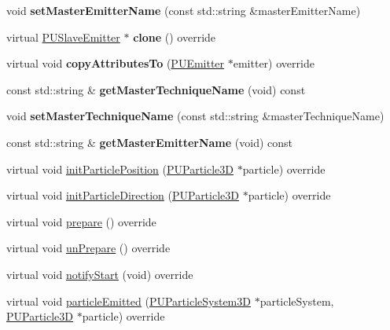 \begin{DoxyCompactItemize}
\mbox{\label{classPUSlaveEmitter_ab17fb354cca69c4c72ee57b47a08f8bc}} 
void {\bfseries set\+Master\+Emitter\+Name} (const std\+::string \&master\+Emitter\+Name)
\item 
\mbox{\label{classPUSlaveEmitter_a0d6b877452c958ede8eb77e0900848e1}} 
virtual \hyperlink{classPUSlaveEmitter}{P\+U\+Slave\+Emitter} $\ast$ {\bfseries clone} () override
\item 
\mbox{\label{classPUSlaveEmitter_a9219c997caf74a5bc433a231b73061b5}} 
virtual void {\bfseries copy\+Attributes\+To} (\hyperlink{classPUEmitter}{P\+U\+Emitter} $\ast$emitter) override
\item 
\mbox{\label{classPUSlaveEmitter_a10ad7cb01485e57d79ccae9603865af5}} 
const std\+::string \& {\bfseries get\+Master\+Technique\+Name} (void) const
\item 
\mbox{\label{classPUSlaveEmitter_abd0d9badc52214ba48523982bb89feb6}} 
void {\bfseries set\+Master\+Technique\+Name} (const std\+::string \&master\+Technique\+Name)
\item 
\mbox{\label{classPUSlaveEmitter_a5e16031328cb5a7aca3446eabca404e7}} 
const std\+::string \& {\bfseries get\+Master\+Emitter\+Name} (void) const
\item 
virtual void \hyperlink{classPUSlaveEmitter_a8498d171d9db253b48e103c9946abba3}{init\+Particle\+Position} (\hyperlink{structPUParticle3D}{P\+U\+Particle3D} $\ast$particle) override
\item 
virtual void \hyperlink{classPUSlaveEmitter_a80d517e16cea272c8b762d7b6e237868}{init\+Particle\+Direction} (\hyperlink{structPUParticle3D}{P\+U\+Particle3D} $\ast$particle) override
\item 
virtual void \hyperlink{classPUSlaveEmitter_a24470699768dab48826a619d024b6b45}{prepare} () override
\item 
virtual void \hyperlink{classPUSlaveEmitter_af1de3a2ef455482bd5faa8a94488a476}{un\+Prepare} () override
\item 
virtual void \hyperlink{classPUSlaveEmitter_aaac4e3c04133147bd475cdd7963fac48}{notify\+Start} (void) override
\item 
virtual void \hyperlink{classPUSlaveEmitter_a154976f88d5195573c17d41af8d8cd71}{particle\+Emitted} (\hyperlink{classPUParticleSystem3D}{P\+U\+Particle\+System3D} $\ast$particle\+System, \hyperlink{structPUParticle3D}{P\+U\+Particle3D} $\ast$particle) override

\end{DoxyCompactItemize}
